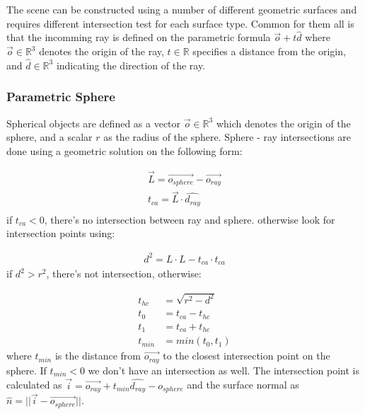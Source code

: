 \documentclass[a4paper, twocolumn]{article}
\begin{document}
        The scene can be constructed using a number of different geometric surfaces and requires different intersection test for each surface type. Common for them all is that the incomming ray is defined on the parametric formula \( \vec{o} + t \hat{d} \) where \( \vec{o} \in \mathbb{R}^3\) denotes the origin of the ray, \(t \in \mathbb{R}\) specifies a distance from the origin, and \(\hat{d} \in \mathbb{R}^3\) indicating the direction of the ray.
            
        \subsubsection{Parametric Sphere} \label{sec:parametric_sphere}
        
        Spherical objects are defined as a vector \(\vec{o} \in \mathbb{R}^3\) which denotes the origin of the sphere, and a scalar \(r\) as the radius of the sphere. Sphere - ray intersections are done using a geometric solution on the following form:

        \begin{align*}
            \vec{L} = \vec{o_{sphere}} - \vec{o_{ray}} \\
            t_{ca} = \vec{L} \cdot  \hat{d_{ray}} \\
        \end{align*}
        if \(t_{ca} < 0\), there's no intersection between ray and sphere. otherwise look for intersection points using:
        
        \begin{align*}
            d^2 = L \cdot L - t_{ca} \cdot t_{ca}
        \end{align*}
        if \(d^2 > r^2\), there's not intersection, otherwise:

        \begin{align*}
            t_{hc} &= \sqrt{r^2 - d^2} \\
            t_0 &= t_{ca} - t_{hc} \\
            t_1 &= t_{ca} + t_{hc} \\
            t_{min} &= min(t_0, t_1)
        \end{align*}
        where \(t_{min}\) is the distance from \(\vec{o_{ray}}\) to the closest intersection point on the sphere. If \(t_{min}  < 0\) we don't have an intersection as well. The intersection point is calculated as  \(\vec{i} = \vec{o_{ray}} + t_{min} \hat{d_{ray}} - o_{sphere} \) and the surface normal as \( \hat{n} = || \vec{i} - \vec{o_{sphere}} || \).
\end{document}

